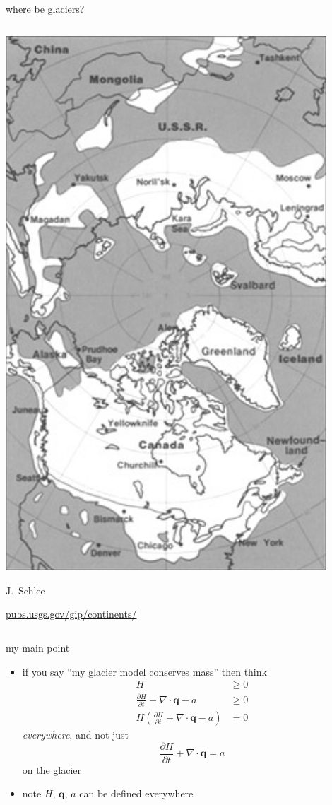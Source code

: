 \documentclass[10pt,hyperref,dvipsnames]{beamer}
\newcommand{\bq}{\mathbf{q}}
\newcommand{\Div}{\nabla\cdot}
\begin{document}
\begin{frame}{where be glaciers?}
\begin{columns}
\begin{column}{0.35\textwidth}
\hfill \includegraphics[width=0.9\textwidth]{figs/Pleistocene_north_ice_map.jpg}

\tiny

\hfill J.~Schlee

\hfill \mbox{\url{pubs.usgs.gov/gip/continents/}}
\end{column}
\end{columns}
\end{frame}


\begin{frame}{my main point}
\begin{itemize}
\item if you say ``my glacier model conserves mass'' then think
\begin{align*}
H &\ge 0 \\
\frac{\partial H}{\partial t} + \Div \bq - a &\ge 0 \\
H \left(\frac{\partial H}{\partial t} + \Div \bq - a\right) &= 0
\end{align*}
\emph{everywhere}, and not just
    $$\frac{\partial H}{\partial t} + \Div \bq = a$$
on the glacier

\medskip
\item<2> note $H$, $\bq$, $a$ can be defined everywhere
\end{itemize}
\end{frame}
\end{document}
